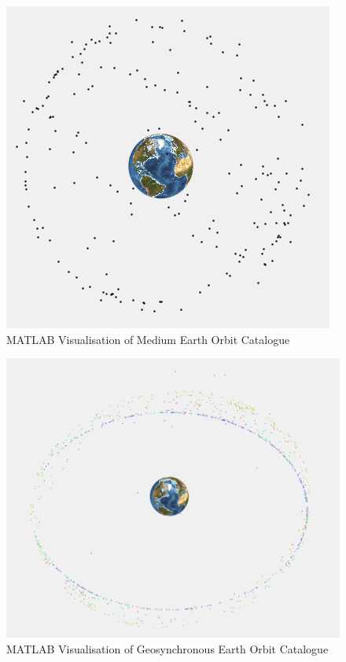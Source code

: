 \documentclass[12pt,openany,a4paper]{book}
\begin{document}
			\begin{figure}[H]
				\centering
				\caption{MATLAB Visualisation of Medium Earth Orbit Catalogue}
				\label{MEO}
				\includegraphics[scale=0.8]{MEO.png}
			\end{figure}
			
			\begin{figure}[H]
				\centering
				\caption{MATLAB Visualisation of Geosynchronous Earth Orbit Catalogue}
				\label{GEO}
				\includegraphics[scale=0.6]{GEO.png}
			\end{figure}
\end{document}
